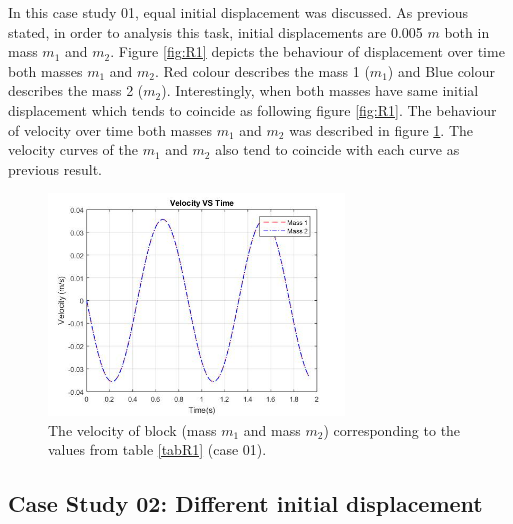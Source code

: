In this case study 01, equal initial displacement was discussed. As previous stated, in order to analysis this task, initial displacements are 0.005 $m$ both in mass $m_1$ and $m_2$. Figure \ref{fig:R1} depicts the behaviour of displacement over time both masses $m_1$ and $m_2$. Red colour describes the mass 1 ($m_1$) and Blue colour describes the mass 2 ($m_2$). Interestingly, when both masses have same initial displacement which tends to coincide as following figure \ref{fig:R1}. The behaviour of velocity over time both masses $m_1$ and $m_2$ was described in figure \ref{fig:R2}. The velocity curves of the $m_1$ and $m_2$ also tend to coincide with each curve as previous result. 

 \begin{figure}[hbt!]
	\centering
	\begin{framed}
	\includegraphics[width=0.7\textwidth]{Figures/R1V.jpg}
		\end{framed}
	\caption{ The velocity of block (mass $m_1$ and mass $m_2$) corresponding to the values from table \ref{tabR1} (case 01).}
	\label{fig:R2}
\end{figure}

\subsection{Case Study 02: Different initial displacement}
\paragraph{}

